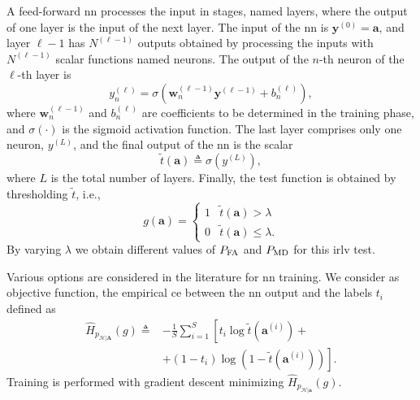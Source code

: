 \documentclass[conference,final]{IEEEtran}
\newcommand{\hatcross}[2]{\hat{H}_{#1}(#2)}
\begin{document}
A feed-forward \ac{nn} processes the input in stages, named layers, where the output of one layer is the input of the next layer. The input of the \ac{nn} is $\bm{y}^{(0)} = \bm{a}$, and layer $\ell-1$ has $N^{(\ell-1)}$ outputs obtained by processing the inputs with $N^{(\ell-1)}$ scalar functions named neurons. The output of the $n$-th neuron of the $\ell$-th layer is
\begin{equation}\label{eq:nonLin}
y_n^{(\ell)} = \sigma\left( \bm{w}_n^{(\ell -1)}\bm{y}^{(\ell-1)}+b_n^{(\ell)} \right),
\end{equation}
where $\bm{w}_n^{(\ell -1)}$ and $b_n^{(\ell)}$ are coefficients to be determined in the training phase, and $\sigma(\cdot)$ is the sigmoid activation function. 
The last layer comprises only one neuron, $y^{(L)}$, and the final output of the \ac{nn} is the scalar 
\begin{equation}
	\tilde{t}(\bm a) \triangleq \sigma(y^{(L)}),	
\end{equation}
where $L$ is the total number of layers. Finally, the test function is obtained by thresholding $\tilde{t}$, i.e.,
\begin{equation}
\label{eq:decNN}
    g(\bm{a}) = \begin{cases}
    1 & \tilde{t}(\bm a) > \lambda \\
    0 & \tilde{t}(\bm a) \leq \lambda.
    \end{cases}
\end{equation}
By varying $\lambda$ we obtain different values of $P_{\rm FA}$ and $P_{\rm MD}$ for this \ac{irlv} test.

Various options are considered in the literature for \ac{nn} training. We consider as objective function, the empirical \ac{ce} between the \ac{nn} output and the labels $t_i$ defined as
\begin{equation}\label{eq:ce}
\begin{split}
\hatcross{p_{\mathcal{H}|\bm A}}{g} \triangleq& -\frac{1}{S} \sum_{i=1}^{S}\left[t_i\log \tilde{t}(\bm a^{(i)}) + \right.\\
&\left. +\left(1-t_i\right)\log\left(1-\tilde{t}(\bm a^{(i)})\right)\right].
\end{split}
\end{equation}
Training is performed with gradient descent minimizing $\hatcross{p_{\mathcal{H}|\bm a}}{g}$.
\end{document}
